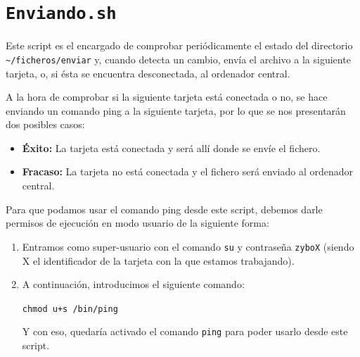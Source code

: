 \newpage
\section{\texttt{Enviando.sh}}
\hypertarget{ScriptEnviando}{}
Este script es el encargado de comprobar periódicamente el estado del directorio\\ \texttt{\textasciitilde/ficheros/enviar} y, cuando detecta un cambio, envía el archivo a la siguiente tarjeta, o, si ésta se encuentra desconectada, al ordenador central.

A la hora de comprobar si la siguiente tarjeta está conectada o no, se hace enviando un comando ping a la siguiente tarjeta, por lo que se nos presentarán dos posibles casos:
\begin{itemize}
	\item \textbf{Éxito:} La tarjeta está conectada y será allí donde se envíe el fichero.
	\item \textbf{Fracaso:} La tarjeta no está conectada y el fichero será enviado al ordenador central.
\end{itemize}

Para que podamos usar el comando ping desde este script, debemos darle permisos de ejecución en modo usuario de la siguiente forma:
\begin{enumerate}
	\item Entramos como super-usuario con el comando \texttt{su} y contraseña \texttt{zyboX} (siendo X el identificador de la tarjeta con la que estamos trabajando).
	\item A continuación, introducimos el siguiente comando:
	\begin{center}
		\texttt{chmod u+s /bin/ping}
	\end{center}
	Y con eso, quedaría activado el comando \texttt{ping} para poder usarlo desde este script.
\end{enumerate}

\newpage
